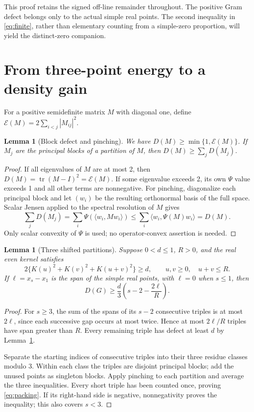 \documentclass[11pt]{article}
\newtheorem{lemma}[theorem]{Lemma}
\theoremstyle{remark}
\DeclareMathOperator{\tr}{tr}
\newcommand{\cE}{\mathcal E}
\begin{document}
This proof retains the signed off-line remainder throughout. The positive
Gram defect belongs only to the actual simple real points. The second
inequality in \eqref{eq:finite}, rather than elementary counting from a
simple-zero proportion, will yield the distinct-zero companion.

\section{From three-point energy to a density gain}

For a positive semidefinite matrix $M$ with diagonal one, define
$\cE(M)=2\sum_{i<j}|M_{ij}|^2$.

\begin{lemma}[Block defect and pinching]\label{lem:pinch}
We have $D(M)\ge\min\{1,\cE(M)\}$. If $M_j$ are the principal blocks
of a partition of $M$, then $D(M)\ge\sum_jD(M_j)$.
\end{lemma}
\begin{proof}
If all eigenvalues of $M$ are at most 2, then
$D(M)=\tr(M-I)^2=\cE(M)$. If some eigenvalue exceeds 2, its own
$\Psi$ value exceeds 1 and all other terms are nonnegative.
For pinching, diagonalize each principal block and let $(w_i)$ be the
resulting orthonormal basis of the full space. Scalar Jensen applied to
the spectral resolution of $M$ gives
\[
 \sum_jD(M_j)=\sum_i\Psi(\langle w_i,Mw_i\rangle)
 \le\sum_i\langle w_i,\Psi(M)w_i\rangle=D(M).
\]
Only scalar convexity of $\Psi$ is used; no operator-convex assertion is
needed.
\end{proof}

\begin{lemma}[Three shifted partitions]\label{lem:triples}
Suppose $0<d\le1$, $R>0$, and the real even kernel satisfies
\begin{equation}\label{eq:triangle}
 2\{K(u)^2+K(v)^2+K(u+v)^2\}\ge d,
 \qquad u,v\ge0,\quad u+v\le R.
\end{equation}
If $\ell=x_s-x_1$ is the span of the simple real points, with $\ell=0$
when $s\le1$, then
\begin{equation}\label{eq:packing}
 D(G)\ge\frac d3\left(s-2-\frac{2\ell}{R}\right).
\end{equation}
\end{lemma}
\begin{proof}
For $s\ge3$, the sum of the spans of its $s-2$ consecutive triples is
at most $2\ell$, since each successive gap occurs at most twice. Hence
at most $2\ell/R$ triples have span greater than $R$. Every remaining
triple has defect at least $d$ by Lemma~\ref{lem:pinch}.

Separate the starting indices of consecutive triples into their three
residue classes modulo 3. Within each class the triples are disjoint
principal blocks; add the unused points as singleton blocks. Apply
pinching to each partition and average the three inequalities. Every
short triple has been counted once, proving \eqref{eq:packing}. If its
right-hand side is negative, nonnegativity proves the inequality; this
also covers $s<3$.
\end{proof}
\end{document}
